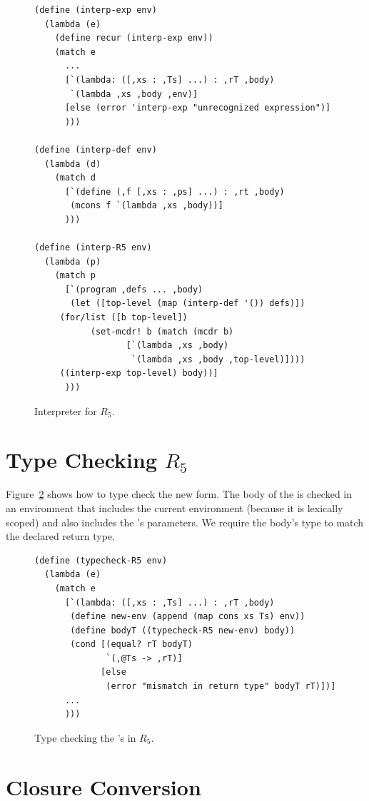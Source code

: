 \documentclass[11pt]{book}
\begin{document}
\begin{figure}[tbp]
\begin{lstlisting}
(define (interp-exp env)
  (lambda (e)
    (define recur (interp-exp env))
    (match e
      ...
      [`(lambda: ([,xs : ,Ts] ...) : ,rT ,body)
       `(lambda ,xs ,body ,env)]
      [else (error 'interp-exp "unrecognized expression")]
      )))

(define (interp-def env)
  (lambda (d)
    (match d
      [`(define (,f [,xs : ,ps] ...) : ,rt ,body)
       (mcons f `(lambda ,xs ,body))]
      )))

(define (interp-R5 env)
  (lambda (p)
    (match p
      [`(program ,defs ... ,body)
       (let ([top-level (map (interp-def '()) defs)])
	 (for/list ([b top-level])
		   (set-mcdr! b (match (mcdr b)
				  [`(lambda ,xs ,body)
				   `(lambda ,xs ,body ,top-level)])))
	 ((interp-exp top-level) body))]
      )))
\end{lstlisting}
\caption{Interpreter for $R_5$.}
\label{fig:interp-R5}
\end{figure}

\section{Type Checking $R_5$}

Figure~\ref{fig:typecheck-R5} shows how to type check the new
 form. The body of the  is checked in an
environment that includes the current environment (because it is
lexically scoped) and also includes the 's parameters.  We
require the body's type to match the declared return type.

\begin{figure}[tbp]
\begin{lstlisting}
(define (typecheck-R5 env)
  (lambda (e)
    (match e
      [`(lambda: ([,xs : ,Ts] ...) : ,rT ,body)
       (define new-env (append (map cons xs Ts) env))
       (define bodyT ((typecheck-R5 new-env) body))
       (cond [(equal? rT bodyT)
              `(,@Ts -> ,rT)]
             [else
              (error "mismatch in return type" bodyT rT)])]
      ...
      )))
\end{lstlisting}
\caption{Type checking the 's in $R_5$.}
\label{fig:typecheck-R5}
\end{figure}


\section{Closure Conversion}
\end{document}

